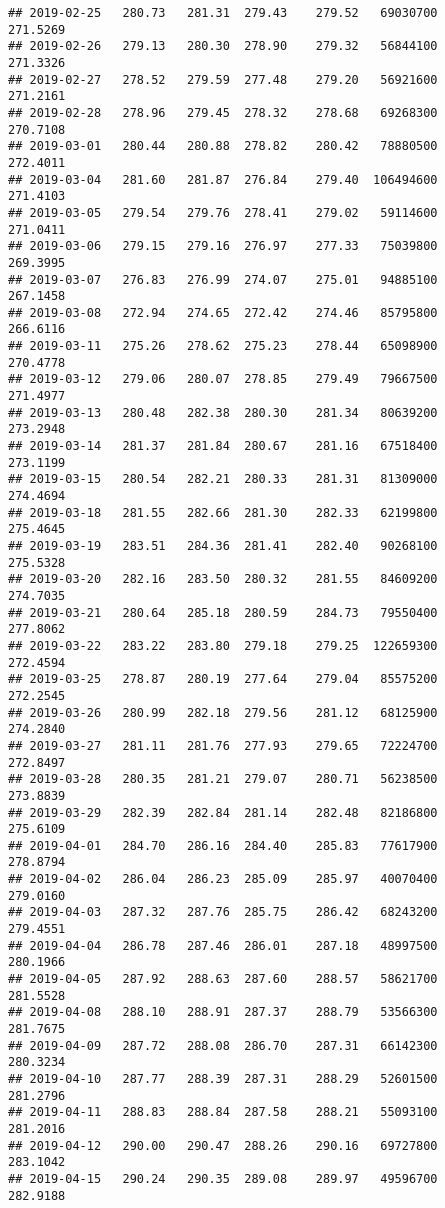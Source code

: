 \documentclass[
]{article}
\begin{document}
\begin{verbatim}
## 2019-02-25   280.73   281.31  279.43    279.52   69030700     271.5269
## 2019-02-26   279.13   280.30  278.90    279.32   56844100     271.3326
## 2019-02-27   278.52   279.59  277.48    279.20   56921600     271.2161
## 2019-02-28   278.96   279.45  278.32    278.68   69268300     270.7108
## 2019-03-01   280.44   280.88  278.82    280.42   78880500     272.4011
## 2019-03-04   281.60   281.87  276.84    279.40  106494600     271.4103
## 2019-03-05   279.54   279.76  278.41    279.02   59114600     271.0411
## 2019-03-06   279.15   279.16  276.97    277.33   75039800     269.3995
## 2019-03-07   276.83   276.99  274.07    275.01   94885100     267.1458
## 2019-03-08   272.94   274.65  272.42    274.46   85795800     266.6116
## 2019-03-11   275.26   278.62  275.23    278.44   65098900     270.4778
## 2019-03-12   279.06   280.07  278.85    279.49   79667500     271.4977
## 2019-03-13   280.48   282.38  280.30    281.34   80639200     273.2948
## 2019-03-14   281.37   281.84  280.67    281.16   67518400     273.1199
## 2019-03-15   280.54   282.21  280.33    281.31   81309000     274.4694
## 2019-03-18   281.55   282.66  281.30    282.33   62199800     275.4645
## 2019-03-19   283.51   284.36  281.41    282.40   90268100     275.5328
## 2019-03-20   282.16   283.50  280.32    281.55   84609200     274.7035
## 2019-03-21   280.64   285.18  280.59    284.73   79550400     277.8062
## 2019-03-22   283.22   283.80  279.18    279.25  122659300     272.4594
## 2019-03-25   278.87   280.19  277.64    279.04   85575200     272.2545
## 2019-03-26   280.99   282.18  279.56    281.12   68125900     274.2840
## 2019-03-27   281.11   281.76  277.93    279.65   72224700     272.8497
## 2019-03-28   280.35   281.21  279.07    280.71   56238500     273.8839
## 2019-03-29   282.39   282.84  281.14    282.48   82186800     275.6109
## 2019-04-01   284.70   286.16  284.40    285.83   77617900     278.8794
## 2019-04-02   286.04   286.23  285.09    285.97   40070400     279.0160
## 2019-04-03   287.32   287.76  285.75    286.42   68243200     279.4551
## 2019-04-04   286.78   287.46  286.01    287.18   48997500     280.1966
## 2019-04-05   287.92   288.63  287.60    288.57   58621700     281.5528
## 2019-04-08   288.10   288.91  287.37    288.79   53566300     281.7675
## 2019-04-09   287.72   288.08  286.70    287.31   66142300     280.3234
## 2019-04-10   287.77   288.39  287.31    288.29   52601500     281.2796
## 2019-04-11   288.83   288.84  287.58    288.21   55093100     281.2016
## 2019-04-12   290.00   290.47  288.26    290.16   69727800     283.1042
## 2019-04-15   290.24   290.35  289.08    289.97   49596700     282.9188

\end{verbatim}
\end{document}
